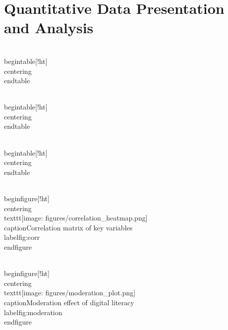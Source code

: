 \chapter{Quantitative Data Presentation and Analysis}
\\begin{table}[!ht]
  \\centering
  \
\\end{table}

\\begin{table}[!ht]
  \\centering
  \
\\end{table}

\\begin{table}[!ht]
  \\centering
  \
\\end{table}

\\begin{figure}[!ht]
  \\centering
  \\texttt{[image: figures/correlation\_heatmap.png]}
  \\caption{Correlation matrix of key variables}
  \\label{fig:corr}
\\end{figure}

\\begin{figure}[!ht]
  \\centering
  \\texttt{[image: figures/moderation\_plot.png]}
  \\caption{Moderation effect of digital literacy}
  \\label{fig:moderation}
\\end{figure}
